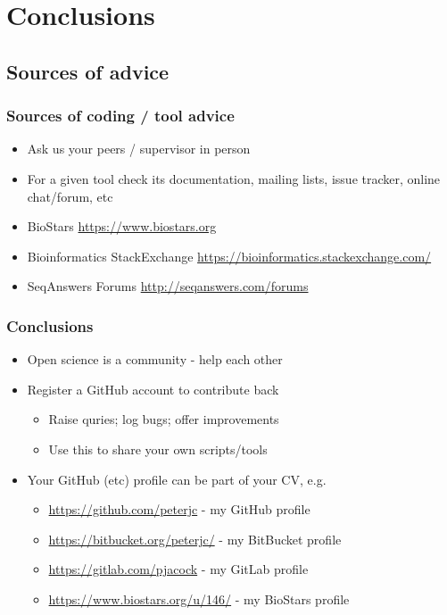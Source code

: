 \section{Conclusions}

\subsection{Sources of advice}

\begin{frame}
  \frametitle{Sources of coding / tool advice}
  \begin{itemize}
    \item Ask us your peers / supervisor in person
    \item For a given tool check its documentation, mailing lists, issue tracker, online chat/forum, etc
    \item BioStars \url{https://www.biostars.org}
    \item Bioinformatics StackExchange \url{https://bioinformatics.stackexchange.com/}
    \item SeqAnswers Forums \url{http://seqanswers.com/forums}
 \end{itemize}
\end{frame}

\begin{frame}
  \frametitle{Conclusions}
  \begin{itemize}
    \item Open science is a community - help each other
    \item Register a GitHub account to contribute back
      \begin{itemize}
        \item Raise quries; log bugs; offer improvements
        \item Use this to share your own scripts/tools
      \end{itemize}
    \item Your GitHub (etc) profile can be part of your CV, e.g.
      \begin{itemize}
        \item \url{https://github.com/peterjc} - my GitHub profile
        \item \url{https://bitbucket.org/peterjc/} - my BitBucket profile
        \item \url{https://gitlab.com/pjacock} - my GitLab profile
        \item \url{https://www.biostars.org/u/146/} - my BioStars profile
      \end{itemize}
 \end{itemize}
\end{frame}

